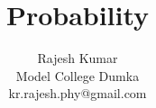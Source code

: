 \documentclass{beamer}
\begin{document}
\title{Probability}
\author{Rajesh Kumar \\Model College Dumka\\kr.rajesh.phy@gmail.com}
\date{}

\begin{frame}
  \titlepage
\end{frame}






\end{document}
